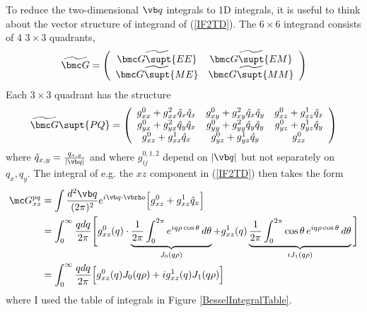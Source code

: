 \documentclass[letterpaper]{article}
\renewcommand{\wt}{\widetilde}
\begin{document}
To reduce the two-dimensional $\vb q$ integrals to 1D integrals,
it is useful to think about the vector structure of integrand
of (\ref{IF2TD}).
The $6\times 6$ integrand consists of 4 $3\times 3$ quadrants,
$$ \wt{\bmc G}=
    \left(\begin{array}{cc}
     \wt{\bmc G\supt{EE}} & \wt{\bmc G\supt{EM}}  \\
     \wt{\bmc G\supt{ME}} & \wt{\bmc G\supt{MM}}
    \end{array}\right)
$$
Each $3\times 3$ quadrant has the structure
$$ \wt{\bmc G}\supt{PQ}=
   \left(\begin{array}{ccc}
   g^0_{xx} + g^2_{xx} \hat{q}_x \hat{q}_x & 
   g^0_{xy} + g^2_{xy} \hat{q}_x \hat{q}_y & 
   g^0_{xz} + g^1_{xz} \hat{q}_x \\
   g^0_{yx} + g^2_{yx} \hat{q}_y \hat{q}_x &
   g^0_{yy} + g^2_{yy} \hat{q}_y \hat{q}_y &
   g^0_{yz} + g^1_{yz} \hat{q}_y \\
   g^0_{xz} + g^1_{xz} \hat{q}_x &
   g^0_{yz} + g^1_{yz} \hat{q}_y & 
   g^0_{zz}
   \end{array}\right)
$$
where $\hat{q}_{x,y}  = \frac{q_{x,y}}{|\vb q|}$ and
where $g_{ij}^{0,1,2}$ depend on $|\vb q|$ but not separately
on $q_x, q_y.$
The integral of e.g. the $xz$ component in (\ref{IF2TD}) then takes the form
\begin{align*}
 \mc G^{pq}_{xz}
&= \int \frac{d^2 \vb q}{(2\pi)^2}
  e^{i\vb q \cdot \vbrho} \Big[ g^0_{xz} + g^1_{xz} \hat{q}_x\Big]
\\
&= \int_0^\infty \frac{q dq}{2\pi}
   \Bigg[ g^0_{xz}(q)\cdot 
          \underbrace{ \frac{1}{2\pi}
                       \int_0^{2\pi} e^{iq\rho\cos\theta}\,d\theta
                     }_{J_0(q\rho)}
         +g^1_{xz}(q)
          \underbrace{ \frac{1}{2\pi}
                       \int_0^{2\pi} \cos\theta \, e^{iq\rho\cos\theta}\,d\theta
                     }_{iJ_1(q\rho)}
   \Bigg]
\\
&=\int_0^\infty \frac{qdq}{2\pi}
   \Big[  g^0_{xz}(q) J_0(q\rho) + ig^1_{xz}(q) J_1(q\rho) \Big]
\end{align*}
where I used the table of integrals in Figure \ref{BesselIntegralTable}.
\end{document}
